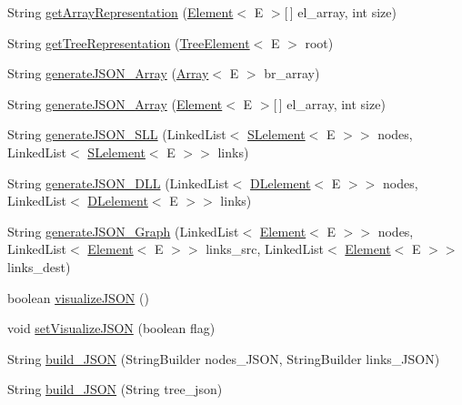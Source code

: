 \begin{DoxyCompactItemize}
\item 
String \hyperlink{classbridges_1_1base_1_1_a_d_t_visualizer_ad44bb58d6f9c630cc6bbcae175003243}{get\+Array\+Representation} (\hyperlink{classbridges_1_1base_1_1_element}{Element}$<$ E $>$\mbox{[}$\,$\mbox{]} el\+\_\+array, int size)
\item 
String \hyperlink{classbridges_1_1base_1_1_a_d_t_visualizer_ae01d3d38d5c7c3ac239e86d6be46a50a}{get\+Tree\+Representation} (\hyperlink{classbridges_1_1base_1_1_tree_element}{Tree\+Element}$<$ E $>$ root)
\item 
String \hyperlink{classbridges_1_1base_1_1_a_d_t_visualizer_a1f37c20302432878a91c03544b81cc27}{generate\+J\+S\+O\+N\+\_\+\+Array} (\hyperlink{classbridges_1_1base_1_1_array}{Array}$<$ E $>$ br\+\_\+array)
\item 
String \hyperlink{classbridges_1_1base_1_1_a_d_t_visualizer_a309d4f0521b66bb1329c0362f1ca5d33}{generate\+J\+S\+O\+N\+\_\+\+Array} (\hyperlink{classbridges_1_1base_1_1_element}{Element}$<$ E $>$\mbox{[}$\,$\mbox{]} el\+\_\+array, int size)
\item 
String \hyperlink{classbridges_1_1base_1_1_a_d_t_visualizer_adf2164b7f4b3befb8b2cb2904efd8c91}{generate\+J\+S\+O\+N\+\_\+\+S\+LL} (Linked\+List$<$ \hyperlink{classbridges_1_1base_1_1_s_lelement}{S\+Lelement}$<$ E $>$$>$ nodes, Linked\+List$<$ \hyperlink{classbridges_1_1base_1_1_s_lelement}{S\+Lelement}$<$ E $>$$>$ links)
\item 
String \hyperlink{classbridges_1_1base_1_1_a_d_t_visualizer_a866df531965d152d5686304f07e15a4a}{generate\+J\+S\+O\+N\+\_\+\+D\+LL} (Linked\+List$<$ \hyperlink{classbridges_1_1base_1_1_d_lelement}{D\+Lelement}$<$ E $>$$>$ nodes, Linked\+List$<$ \hyperlink{classbridges_1_1base_1_1_d_lelement}{D\+Lelement}$<$ E $>$$>$ links)
\item 
String \hyperlink{classbridges_1_1base_1_1_a_d_t_visualizer_aabf7cbfbed0cd28b365206281176834b}{generate\+J\+S\+O\+N\+\_\+\+Graph} (Linked\+List$<$ \hyperlink{classbridges_1_1base_1_1_element}{Element}$<$ E $>$$>$ nodes, Linked\+List$<$ \hyperlink{classbridges_1_1base_1_1_element}{Element}$<$ E $>$$>$ links\+\_\+src, Linked\+List$<$ \hyperlink{classbridges_1_1base_1_1_element}{Element}$<$ E $>$$>$ links\+\_\+dest)
\item 
boolean \hyperlink{classbridges_1_1base_1_1_a_d_t_visualizer_a1aa47f3633239060197b523cb6b86e06}{visualize\+J\+S\+ON} ()
\item 
void \hyperlink{classbridges_1_1base_1_1_a_d_t_visualizer_a784ce15d23e6c8ff0d6e77f2274e2980}{set\+Visualize\+J\+S\+ON} (boolean flag)
\item 
String \hyperlink{classbridges_1_1base_1_1_a_d_t_visualizer_a86ec26c0bb98a48a63366ce380ca958f}{build\+\_\+\+J\+S\+ON} (String\+Builder nodes\+\_\+\+J\+S\+ON, String\+Builder links\+\_\+\+J\+S\+ON)
\item 
String \hyperlink{classbridges_1_1base_1_1_a_d_t_visualizer_a520eef21260f327101b7e013f9814c45}{build\+\_\+\+J\+S\+ON} (String tree\+\_\+json)
\end{DoxyCompactItemize}
